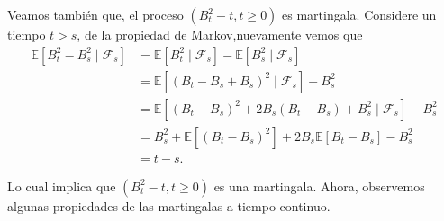 Veamos también que, el proceso $(B_t^2 - t, t \geq 0)$ es martingala. Considere un tiempo $t > s$, de la propiedad de Markov,nuevamente vemos que
\begin{align*}
	\mathbb{E} \left[B_t^2 - B_s^2 \mid \mathcal{F}_s \right] & = \mathbb{E}\left[B_t^2 \mid \mathcal{F}_s\right] - \mathbb{E}\left[B_s^2 \mid \mathcal{F}_s\right] \\
    & = \mathbb{E} \left[ \left(B_t - B_s + B_s \right)^2 \mid \mathcal{F}_s \right] - B_s^2 \\
    & = \mathbb{E} \left[ \left(B_t - B_s \right)^2 + 2 B_s \left(B_t - B_s \right) + B_s^2 \mid \mathcal{F}_s \right] - B_s^2 \\
    & = B_s^2 + \mathbb{E} \left[ \left(B_t - B_s \right)^2 \right] + 2B_s \mathbb{E} \left[B_t - B_s \right] - B_s^2 \\
    & = t - s.
\end{align*}

Lo cual implica que $(B_t^2 - t, t \geq 0)$ es una martingala. Ahora, observemos algunas propiedades de las martingalas a tiempo continuo.

